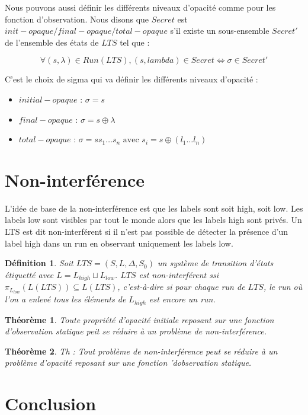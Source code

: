 \documentclass[10pt,a4paper]{article}
\newtheorem{mydef}{D\'efinition}
\newtheorem{myth}{Th\'eor\`eme}
\begin{document}
Nous pouvons aussi d\'efinir les diff\'erents niveaux d'opacit\'e comme pour les fonction d'observation. Nous disons que $Secret$ est $init-opaque/final-opaque/total-opaque$ s'il existe un sous-ensemble  $Secret'$ de l'ensemble des \'etats de $LTS$ tel que :

$$\forall (s,\lambda) \in Run(LTS), (s,lambda) \in Secret \Leftrightarrow \sigma \in Secret'$$

C'est le choix de sigma qui va d\'efinir les diff\'erents niveaux d'opacit\'e :

\begin{itemize}
	\item $initial-opaque$ : $\sigma = s$
	\item $final-opaque$ : $\sigma = s\oplus \lambda$
	\item $total-opaque$ : $\sigma = s s_1 \dots s_n \mbox{ avec } s_i = s\oplus(l_1\dots l_n)$
\end{itemize} 

\section{Non-interf\'erence}

L'id\'ee de base de la non-interf\'erence est que les labels sont soit high, soit low. Les labels low sont visibles par tout le monde alors que les labels high sont priv\'es. Un LTS est dit non-interf\'erent si il n'est pas possible de d\'etecter la pr\'esence d'un label high dans un run en observant uniquement les labels low.~\cite{GorrieriV10}

\begin{mydef}
  Soit $LTS = (S,L,\Delta,S_0)$ un syst\`eme de transition d'\'etats \'etiquett\'e avec $L=L_{high}\sqcup L_{low}$. $LTS$ est non-interf\'erent ssi $\pi_{L_{low}}(L(LTS)) \subseteq L(LTS)$, c'est-\`a-dire si pour chaque run de $LTS$, le run o\`u l'on a enlev\'e tous les \'el\'ements de $L_{high}$ est encore un run.
\end{mydef}
\begin{myth}
Toute propri\'et\'e d'opacit\'e initiale reposant sur une fonction d'observation statique peit se r\'eduire \`a un probl\`eme  de non-interf\'erence.
\end{myth}
\begin{myth}
Th : Tout probl\`eme de non-interf\'erence peut se r\'eduire \`a un probl\`eme d'opacit\'e reposant sur une fonction 'dobservation statique.
\end{myth}
\section{Conclusion}
\end{document}
